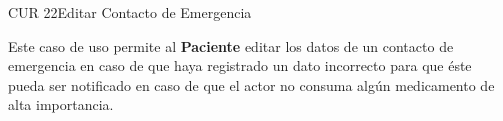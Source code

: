 \begin{UseCase}{CUR 22}{Editar Contacto de Emergencia}
    {
    	Este caso de uso permite al \textbf{Paciente} editar los datos de un contacto de emergencia en caso de que haya registrado un dato incorrecto para que éste pueda ser notificado en caso de que el actor no consuma algún medicamento de alta importancia.  
    	

    }


\end{UseCase}
